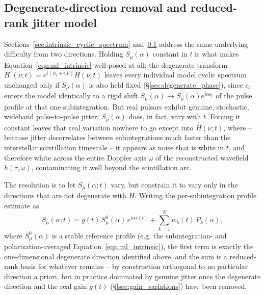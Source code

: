 \documentclass[manuscript]{aastex631}
\newcommand{\Eqn}[1]{Equation~\ref{eqn:#1}}
\begin{document}



\subsection{Degenerate-direction removal and reduced-rank jitter model}
\label{sec:jitter}

Sections~\ref{sec:intrinsic_cyclic_spectrum} and~\ref{sec:jitter} address the
same underlying difficulty from two directions. Holding $S_\mu(\alpha)$
constant in $t$ is what makes \Eqn{ml_intrinsic} well posed at all: the
degenerate transform $H^\prime(\nu;t)=e^{i(\phi_t+\epsilon_t\nu)}H(\nu;t)$
leaves every individual model cyclic spectrum unchanged only if
$S_\mu(\alpha)$ is also held fixed (\S\ref{sec:degenerate_phase}), since
$\epsilon_t$ enters the model identically to a rigid shift
$S_\mu(\alpha)\rightarrow S_\mu(\alpha)e^{i\alpha\epsilon_t}$ of the pulse
profile at that one subintegration. But real pulsars exhibit genuine,
stochastic, wideband pulse-to-pulse jitter: $S_\mu(\alpha)$ does, in fact,
vary with $t$. Forcing it constant leaves that real variation nowhere to
go except into $H(\nu;t)$, where -- because jitter decorrelates between
subintegrations much faster than the interstellar scintillation timescale
-- it appears as noise that is white in $t$, and therefore white across
the entire Doppler axis $\omega$ of the reconstructed wavefield
$h(\tau,\omega)$, contaminating it well beyond the scintillation arc.

The resolution is to let $S_\mu(\alpha;t)$ vary, but constrain it to vary
only in the directions that are not degenerate with $H$. Writing the
per-subintegration profile estimate as
%
\begin{equation}
S_\mu(\alpha;t) = g(t)\,S_\mu^0(\alpha)\,e^{i\alpha\epsilon(t)} + \sum_{k=1}^{N} w_k(t)\,P_k(\alpha),
\label{eqn:jitter_model}
\end{equation}
%
where $S_\mu^0(\alpha)$ is a stable reference profile (e.g. the
subintegration- and polarization-averaged \Eqn{ml_intrinsic}), the first
term is exactly the one-dimensional degenerate direction identified above,
and the sum is a reduced-rank basis for whatever remains -- by
construction orthogonal to no particular direction a priori, but in
practice dominated by genuine jitter once the degenerate direction and the
real gain $g(t)$ (\S\ref{sec:gain_variations}) have been removed.
\end{document}

